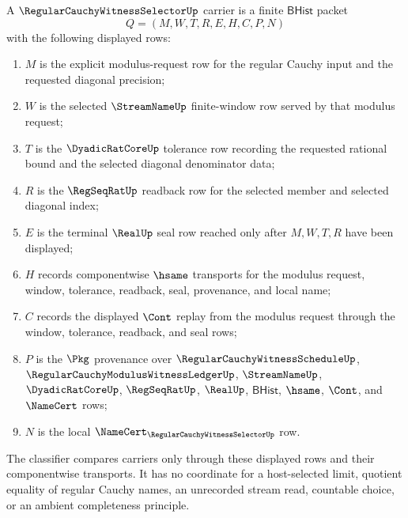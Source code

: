 \begin{definition}
\label{def:regular-cauchy-witness-selector-packet}
A $\RegularCauchyWitnessSelectorUp$ carrier is a finite $\mathsf{BHist}$ packet
$$
Q=(M,W,T,R,E,H,C,P,N)
$$
with the following displayed rows:
\begin{enumerate}
\item $M$ is the explicit modulus-request row for the regular Cauchy input and the requested diagonal precision;
\item $W$ is the selected $\StreamNameUp$ finite-window row served by that modulus request;
\item $T$ is the $\DyadicRatCoreUp$ tolerance row recording the requested rational bound and the selected diagonal denominator data;
\item $R$ is the $\RegSeqRatUp$ readback row for the selected member and selected diagonal index;
\item $E$ is the terminal $\RealUp$ seal row reached only after $M,W,T,R$ have been displayed;
\item $H$ records componentwise $\hsame$ transports for the modulus request, window, tolerance, readback, seal, provenance, and local name;
\item $C$ records the displayed $\Cont$ replay from the modulus request through the window, tolerance, readback, and seal rows;
\item $P$ is the $\Pkg$ provenance over $\RegularCauchyWitnessScheduleUp$, $\RegularCauchyModulusWitnessLedgerUp$, $\StreamNameUp$, $\DyadicRatCoreUp$, $\RegSeqRatUp$, $\RealUp$, $\mathsf{BHist}$, $\hsame$, $\Cont$, and $\NameCert$ rows;
\item $N$ is the local $\NameCert_{\RegularCauchyWitnessSelectorUp}$ row.
\end{enumerate}
The classifier compares carriers only through these displayed rows and their componentwise transports. It has no coordinate for a host-selected limit, quotient equality of regular Cauchy names, an unrecorded stream read, countable choice, or an ambient completeness principle.
\end{definition}

